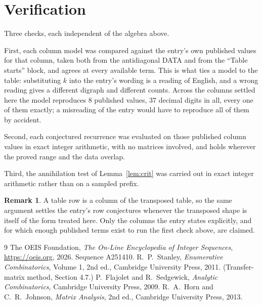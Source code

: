 \documentclass[11pt,a4paper]{article}
\theoremstyle{plain}
\theoremstyle{definition}
\newtheorem{remark}[theorem]{Remark}
\begin{document}
\section{Verification}

Three checks, each independent of the algebra above.

First, each column model was compared against the entry's own published values for that
column, taken both from the antidiagonal DATA and from the ``Table starts'' block, and agrees
at every available term. This is what ties a model to the table: substituting $k$ into the
entry's wording is a reading of English, and a wrong reading gives a different digraph and
different counts. Across the columns settled here the model reproduces $8$ published
values, $37$ decimal digits in all, every one of them exactly; a misreading of the entry
would have to reproduce all of them by accident.

Second, each conjectured recurrence was evaluated on those published column values in exact
integer arithmetic, with no matrices involved, and holds wherever the proved range and the
data overlap.

Third, the annihilation test of Lemma~\ref{lem:crit} was carried out in exact integer
arithmetic rather than on a sampled prefix.

\begin{remark}
A table row is a column of the transposed table, so the same argument settles the entry's row
conjectures whenever the transposed shape is itself of the form treated here. Only the columns
the entry states explicitly, and for which enough published terms exist to run the first check
above, are claimed.
\end{remark}

\begin{thebibliography}{9}
 The OEIS Foundation, \emph{The On-Line Encyclopedia of Integer
Sequences}, \url{https://oeis.org}, 2026. Sequence A251410.
 R.~P.~Stanley, \emph{Enumerative Combinatorics}, Volume 1, 2nd ed.,
Cambridge University Press, 2011. (Transfer-matrix method, Section 4.7.)
 P.~Flajolet and R.~Sedgewick, \emph{Analytic Combinatorics}, Cambridge
University Press, 2009.
 R.~A.~Horn and C.~R.~Johnson, \emph{Matrix Analysis}, 2nd ed., Cambridge
University Press, 2013.
\end{thebibliography}
\end{document}
